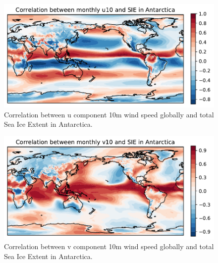 \begin{figure}[H]
    \centering
    \includegraphics[width=\textwidth]{Images/global_correlation_monthly_u10_sie.pdf}
    \caption{Correlation between u component 10m wind speed globally and total Sea Ice Extent in Antarctica.}
    \label{fig:u10_sie_corr}
\end{figure}

\begin{figure}[H]
    \centering
    \includegraphics[width=\textwidth]{Images/global_correlation_monthly_v10_sie.pdf}
    \caption{Correlation between v component 10m wind speed globally and total Sea Ice Extent in Antarctica.}
    \label{fig:v10_sie_corr}
\end{figure}
